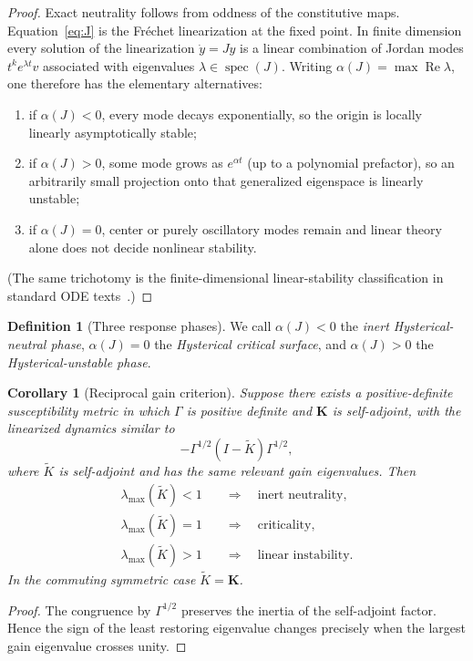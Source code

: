 \documentclass[11pt]{article}
\newtheorem{corollary}[theorem]{Corollary}
\theoremstyle{definition}
\newtheorem{definition}[theorem]{Definition}
\theoremstyle{remark}
\newcommand{\K}{\mathbf{K}}
\newcommand{\Gm}{\Gamma}
\begin{document}
\begin{proof}
Exact neutrality follows from oddness of the constitutive maps.  Equation~\eqref{eq:J} is the Fr\'echet linearization at the fixed point.
In finite dimension every solution of the linearization $\dot y=Jy$ is a linear combination of Jordan modes $t^k e^{\lambda t}v$ associated with eigenvalues $\lambda\in\operatorname{spec}(J)$.
Writing $\alpha(J)=\max\operatorname{Re}\lambda$, one therefore has the elementary alternatives:
\begin{enumerate}[label=(\roman*)]
 \item if $\alpha(J)<0$, every mode decays exponentially, so the origin is locally linearly asymptotically stable;
 \item if $\alpha(J)>0$, some mode grows as $e^{\alpha t}$ (up to a polynomial prefactor), so an arbitrarily small projection onto that generalized eigenspace is linearly unstable;
 \item if $\alpha(J)=0$, center or purely oscillatory modes remain and linear theory alone does not decide nonlinear stability.
\end{enumerate}
(The same trichotomy is the finite-dimensional linear-stability classification in standard ODE texts~\cite{perko2001}.)
\end{proof}

\begin{definition}[Three response phases]
We call $\alpha(J)<0$ the \emph{inert Hysterical-neutral phase}, $\alpha(J)=0$ the \emph{Hysterical critical surface}, and $\alpha(J)>0$ the \emph{Hysterical-unstable phase}.
\end{definition}

\begin{corollary}[Reciprocal gain criterion]\label{cor:reciprocal}
Suppose there exists a positive-definite susceptibility metric in which $\Gm$ is positive definite and $\K$ is self-adjoint, with the linearized dynamics similar to
\begin{equation}
 -\Gm^{1/2}(I-\widetilde K)\Gm^{1/2},
\end{equation}
where $\widetilde K$ is self-adjoint and has the same relevant gain eigenvalues.  Then
\begin{align}
 \lambda_{\max}(\widetilde K)<1 &\quad\Longrightarrow\quad \text{inert neutrality},\\
 \lambda_{\max}(\widetilde K)=1 &\quad\Longrightarrow\quad \text{criticality},\\
 \lambda_{\max}(\widetilde K)>1 &\quad\Longrightarrow\quad \text{linear instability}.
\end{align}
In the commuting symmetric case $\widetilde K=\K$.
\end{corollary}
\begin{proof}
The congruence by $\Gm^{1/2}$ preserves the inertia of the self-adjoint factor.  Hence the sign of the least restoring eigenvalue changes precisely when the largest gain eigenvalue crosses unity.
\end{proof}
\end{document}
